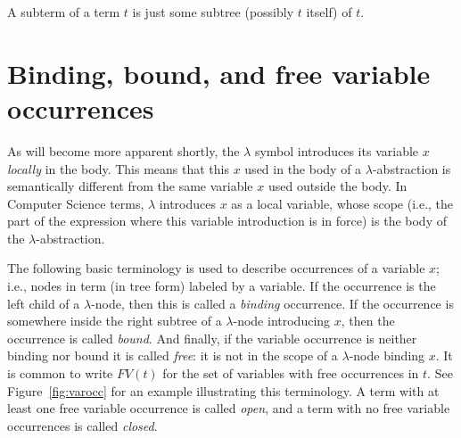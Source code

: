 \begin{definition}[subterm]
  A subterm of a term $t$ is just some subtree (possibly $t$ itself) of $t$.
  \end{definition}

\section{Binding, bound, and free variable occurrences}

As will become more apparent shortly, the $\lambda$ symbol introduces
its variable $x$ \emph{locally} in the body.  This means that this $x$
used in the body of a $\lambda$-abstraction is semantically different
from the same variable $x$ used outside the body.  In Computer Science
terms, $\lambda$ introduces $x$ as a local variable, whose scope
(i.e., the part of the expression where this variable introduction is
in force) is the body of the $\lambda$-abstraction.

The following basic terminology is used to describe occurrences of a
variable $x$; i.e., nodes in term (in tree form) labeled by a
variable.  If the occurrence is the left child of a $\lambda$-node,
then this is called a \emph{binding} occurrence.  If the occurrence is somewhere inside the right
subtree of a $\lambda$-node introducing $x$, then the occurrence is
called \emph{bound}.  And finally, if
the variable occurrence is neither binding nor bound it is called
\emph{free}: it is not in the scope of
a $\lambda$-node binding $x$.  It is common to write $\textit{FV}(t)$
for the set of variables with free occurrences in $t$.  See
Figure~\ref{fig:varocc} for an example illustrating this terminology.
A term with at least one free variable occurrence is called \emph{open},
and a term with no free variable occurrences is called \emph{closed}.

